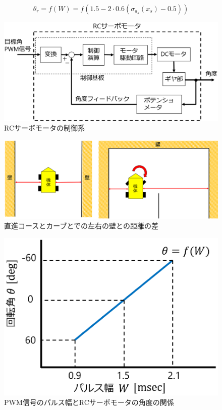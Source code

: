 \begin{equation}  
  \theta_{r} = f(W) =f(1.5-2\cdot0.6(\sigma_{a_{s}}(x_{s})-0.5))
\end{equation}

\begin{figure}[htb]

  \centering
    \includegraphics[width=0.7\hsize]{picture/eps/RC_construction.eps}
  \caption{RCサーボモータの制御系}
  \label{fig::RC_construction}
\end{figure} 

\begin{figure}[htb]

  \centering
    \includegraphics[width=0.8\hsize]{picture/eps/steering_compa.eps}
  \caption{直進コースとカーブとでの左右の壁との距離の差}
  \label{fig::steering_compa}
\end{figure}  

\begin{figure}[htb]

  \centering
    \includegraphics[width=0.5\hsize]{picture/eps/RC_pulse.eps}
  \caption{PWM信号のパルス幅とRCサーボモータの角度の関係}
  \label{fig::RC_pulse}
\end{figure} 
 
